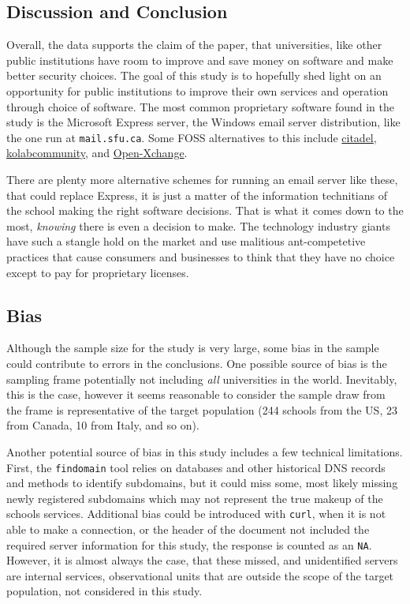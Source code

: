 \documentclass{article}
\theoremstyle{definition}
\begin{document}
\begin{flushleft}
\begin{multicols}{2}
\subsection{Discussion and Conclusion}
Overall, the data supports the claim of the paper, that universities,
like other public institutions have room to improve and save money on
software and make better security choices.
The goal of this study is to hopefully shed
light on an opportunity for public institutions to improve their own
services and operation through choice of software. The most common
proprietary software found in the study is the Microsoft Express
server, the Windows email server distribution, like the one run at
\texttt{mail.sfu.ca}. Some FOSS alternatives to this include
\href{https://www.citadel.org/}{citadel},
\href{https://kolab.org/}{kolabcommunity}, and
\href{https://www.open-xchange.com/}{Open-Xchange}.

There are plenty more alternative schemes for running an email server like
these, that could replace Express, it is just a matter of
the information technitians of the school making the right software
decisions. That is what it comes down to the most, \textit{knowing}
there is even a decision to make. The technology industry giants have
such a stangle hold on the market and use malitious ant-competetive
practices that cause consumers and businesses to think that they have
no choice except to pay for proprietary licenses.

\subsection{Bias}
Although the sample size for the study is very large, some bias in the sample
could contribute to errors in the conclusions. One possible source of bias
is the sampling frame potentially not including \textit{all} universities in
the world. Inevitably, this is the case, however it seems reasonable to consider
the sample draw from the frame is representative of the target population
(244 schools from the US, 23 from Canada, 10 from Italy, and so on).

Another potential source of bias in this study includes a few technical
limitations. First, the \texttt{findomain} tool relies on databases and
other historical DNS records and methods to identify subdomains, but it
could miss some, most likely missing newly registered subdomains which
may not represent the true makeup of the schools services. Additional
bias could be introduced with \texttt{curl}, when it is not able
to make a connection, or the header of the document not included the required
server information for this study, the response is counted as an \texttt{NA}.
However, it is almost always the case, that these
missed, and unidentified servers are internal services, observational units that
are outside the scope of the target population, not considered in this study.


\end{multicols}
\end{flushleft}
\end{document}
